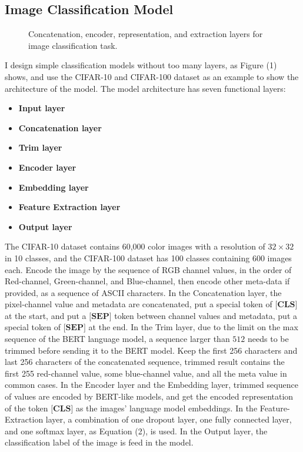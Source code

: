 \documentclass[review]{cvpr}
\begin{document}
\subsection{Image Classification Model}

\begin{figure*}
\begin{center}
\end{center}
   \caption{Concatenation, encoder, representation, and extraction layers for image classification task.}
\label{fig:short}
\end{figure*}

I design simple classification models without too many layers, as Figure (1) shows,
and use the CIFAR-10 and CIFAR-100 dataset as an example to show the architecture of the model.
The model architecture has seven functional layers:

\begin{itemize}
\item {\bf Input layer}
\item {\bf Concatenation layer}
\item {\bf Trim layer}
\item {\bf Encoder layer}
\item {\bf Embedding layer}
\item {\bf Feature Extraction layer}
\item {\bf Output layer}
\end{itemize}

\par The CIFAR-10 dataset contains 60,000 color images with a resolution of $32\times32$ in 10 classes, and the CIFAR-100 dataset has 100 classes containing 600 images each.
Encode the image by the sequence of RGB channel values, in the order of Red-channel, Green-channel, and Blue-channel,
then encode other meta-data if provided, as a sequence of ASCII characters.
In the Concatenation layer, the pixel-channel value and metadata are concatenated, put a special token of $\textbf{[CLS]}$ at the start,
and put a $\textbf{[SEP]}$ token between channel values and metadata, put a special token of $\textbf{[SEP]}$ at the end.
In the Trim layer, due to the limit on the max sequence of the BERT language model, a sequence larger than $512$ needs to be trimmed before sending it to the BERT model.
Keep the first 256 characters and last 256 characters of the concatenated sequence, trimmed result contains the first 255 red-channel value,
some blue-channel value, and all the meta value in common cases.
In the Encoder layer and the Embedding layer, trimmed sequence of values are encoded by BERT-like models,
and get the encoded representation of the token $\textbf{[CLS]}$ as the images' language model embeddings.
In the Feature-Extraction layer, a combination of one dropout layer, one fully connected layer, and one softmax layer, as Equation (2), is used.
In the Output layer, the classification label of the image is feed in the model.
\end{document}
